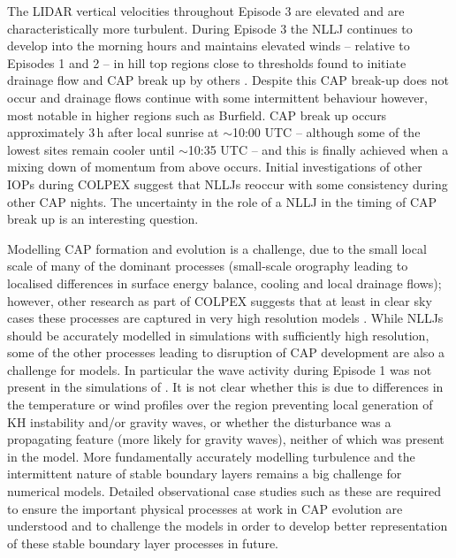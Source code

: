 \documentclass[times]{qjrms4}
\begin{document}
The LIDAR vertical velocities throughout Episode 3 are elevated and are characteristically more turbulent. During Episode 3 the NLLJ continues to develop into the morning hours and maintains elevated winds -- relative to Episodes 1 and 2 -- in hill top regions close to thresholds found to initiate drainage flow and CAP break up by others \citep{barr1989influence,orgill1992mesoscale,bogren2000local,iijima2000seasonal,whiteman2001cold,vosper2008numerical}.  Despite this CAP break-up does not occur and drainage flows continue with some intermittent behaviour however, most notable in higher regions such as Burfield. CAP break up occurs approximately 3$\,\mbox{h}$ after local sunrise at $\sim$10:00 UTC -- although some of the lowest sites remain cooler until $\sim$10:35 UTC -- and this is finally achieved when a mixing down of momentum from above occurs. Initial investigations of other IOPs during COLPEX suggest that NLLJs reoccur with some consistency during other CAP nights. The uncertainty in the role of a NLLJ in the timing of CAP break up is an interesting question.

Modelling CAP formation and evolution is a challenge, due to the small local scale of many of the dominant processes (small-scale orography leading to localised differences in surface energy balance, cooling and local drainage flows); however, other research as part of COLPEX suggests that at least in clear sky cases these processes are captured in very high resolution models \citep{vosper2013high,Vosper2013narrow,hughes2015assessment}. While NLLJs should be accurately modelled in simulations with sufficiently high resolution, some of the other processes leading to disruption of CAP development are also a challenge for models. In particular the wave activity during Episode 1 was not present in the simulations of \citep{Vosper2013narrow}. It is not clear whether this is due to differences in the temperature or wind profiles over the region preventing local generation of KH instability and/or gravity waves, or whether the disturbance was a propagating feature (more likely for gravity waves), neither of which was present in the model. More fundamentally accurately modelling turbulence and the intermittent nature of stable boundary layers remains a big challenge for numerical models. Detailed observational case studies such as these are required to ensure the important physical processes at work in CAP evolution are understood and to challenge the models in order to develop better representation of these stable boundary layer processes in future. 
\end{document}
